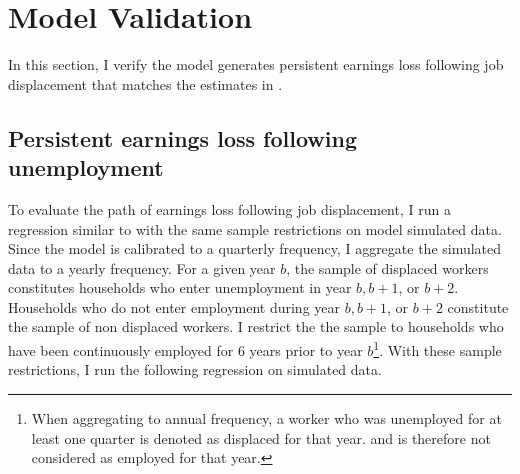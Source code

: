 \begin{center}
\begin{table}[H]
\renewcommand{\arraystretch}{1.6}
\caption{Rest of Economy Calibration}\label{table:Calibration}
\end{table}
\end{center}



\section{Model Validation}

In this section, I verify the model generates persistent earnings loss following job displacement that matches the estimates in \cite{DavisVonWachter2011}. 

\subsection{Persistent earnings loss following unemployment}

To evaluate the path of earnings loss following job displacement, I run a regression similar to \cite{DavisVonWachter2011} with the same sample restrictions on model simulated data. Since the model is calibrated to a quarterly frequency, I aggregate the simulated data to a yearly frequency. For a given year $b$, the sample of displaced workers constitutes households who enter unemployment in year $b, b+1$, or $b+2$.  Households who do not enter employment during year $b, b+1$, or $b+2$ constitute the sample of non displaced workers. I restrict the the sample to households who have been continuously employed for 6 years prior to year $b$\footnote{When aggregating to annual frequency, a worker who was unemployed  for at least one quarter is denoted as displaced for that year. and is therefore not considered as employed for that year.}. With these sample restrictions, I run the following regression on simulated data.


